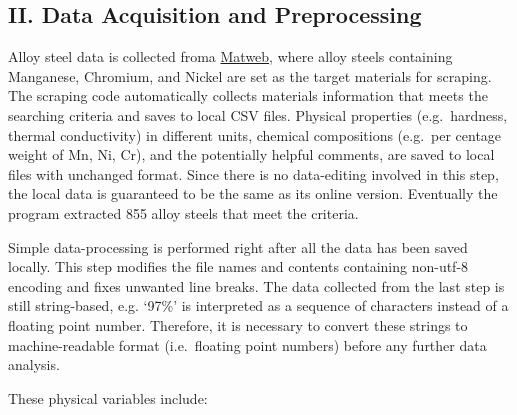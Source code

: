 \documentclass[11pt]{article}
\begin{document}
    

    \hypertarget{ii.-data-acquisition-and-preprocessing}{%
\subsection{II. Data Acquisition and
Preprocessing}\label{ii.-data-acquisition-and-preprocessing}}

    Alloy steel data is collected froma
\href{http://www.matweb.com/index.aspx}{Matweb}, where alloy steels
containing Manganese, Chromium, and Nickel are set as the target
materials for scraping. The scraping code automatically collects
materials information that meets the searching criteria and saves to
local CSV files. Physical properties (e.g.~hardness, thermal
conductivity) in different units, chemical compositions (e.g.~per
centage weight of Mn, Ni, Cr), and the potentially helpful comments, are
saved to local files with unchanged format. Since there is no
data-editing involved in this step, the local data is guaranteed to be
the same as its online version. Eventually the program extracted 855
alloy steels that meet the criteria.

Simple data-processing is performed right after all the data has been
saved locally. This step modifies the file names and contents containing
non-utf-8 encoding and fixes unwanted line breaks. The data collected
from the last step is still string-based, e.g. `97\%' is interpreted as
a sequence of characters instead of a floating point number. Therefore,
it is necessary to convert these strings to machine-readable format
(i.e.~floating point numbers) before any further data analysis.

These physical variables include:
\end{document}
